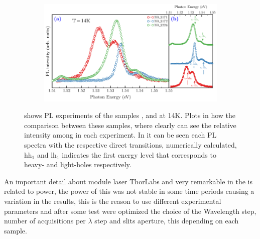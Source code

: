 \begin{figure}[hbt!]
	\centering
	\begin{subfigure}{\textwidth}
		\includegraphics[width=\textwidth]{../figures/chapter-3/pl-plots/build-ruco/pl-1}
		\label{subfig:chapter-3-PL-experiments-M4_3171-M4_3172-M4_3226-a)}
		\label{subfig:chapter-3-PL-experiments-M4_3171-M4_3172-M4_3226-b)}
	\end{subfigure}
	\caption{ 
 shows PL experiments of the samples ,  and  at 14K. Plots in how the comparison between
these samples, where clearly can see the relative intensity among in each experiment. In  it
can be seen each PL spectra with the respective direct transitions, numerically calculated, $\mathrm{hh}_1$
and  $\mathrm{lh}_1$ indicates the first energy level that corresponds to heavy- and light-holes respectively.}
		\label{fig:chapter-3-PL-experiments-M4_3171-M4_3172-M4_3226}
\end{figure}

An important detail about module laser ThorLabs and very remarkable in the  is related to power, the power of this was not stable in some time periods causing a variation in the results, this is the reason to use different experimental parameters  and after some test were optimized the choice  of the Wavelength step, number of acquisitions per $\lambda$ step and slits aperture, this depending on each sample. 

